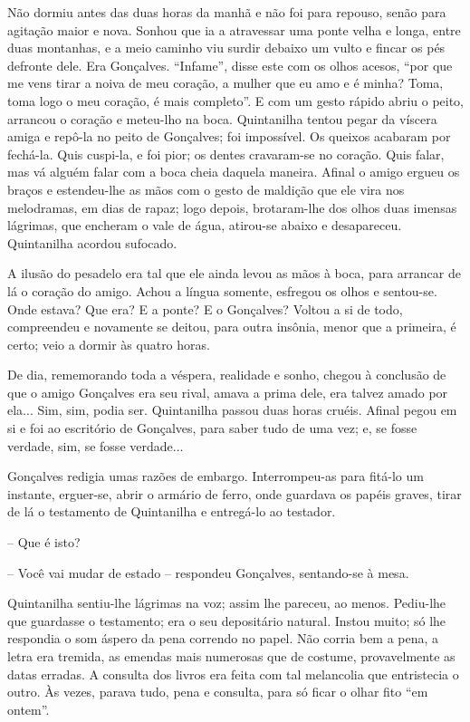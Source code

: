 Não dormiu antes das duas horas da manhã e não foi para repouso, senão
para agitação maior e nova. Sonhou que ia a atravessar uma ponte velha e
longa, entre duas montanhas, e a meio caminho viu surdir debaixo um
vulto e fincar os pés defronte dele. Era Gonçalves. ``Infame'', disse
este com os olhos acesos, ``por que me vens tirar a noiva de meu
coração, a mulher que eu amo e é minha? Toma, toma logo o meu coração, é
mais completo''. E com um gesto rápido abriu o peito, arrancou o coração
e meteu-lho na boca. Quintanilha tentou pegar da víscera amiga e repô-la
no peito de Gonçalves; foi impossível. Os queixos acabaram por fechá-la.
Quis cuspi-la, e foi pior; os dentes cravaram-se no coração. Quis falar,
mas vá alguém falar com a boca cheia daquela maneira. Afinal o amigo
ergueu os braços e estendeu-lhe as mãos com o gesto de maldição que ele
vira nos melodramas, em dias de rapaz; logo depois, brotaram-lhe dos
olhos duas imensas lágrimas, que encheram o vale de água, atirou-se
abaixo e desapareceu. Quintanilha acordou sufocado.

A ilusão do pesadelo era tal que ele ainda levou as mãos à boca, para
arrancar de lá o coração do amigo. Achou a língua somente, esfregou os
olhos e sentou-se. Onde estava? Que era? E a ponte? E o Gonçalves?
Voltou a si de todo, compreendeu e novamente se deitou, para outra
insônia, menor que a primeira, é certo; veio a dormir às quatro horas.

De dia, rememorando toda a véspera, realidade e sonho, chegou à
conclusão de que o amigo Gonçalves era seu rival, amava a prima dele,
era talvez amado por ela... Sim, sim, podia ser. Quintanilha passou duas
horas cruéis. Afinal pegou em si e foi ao escritório de Gonçalves, para
saber tudo de uma vez; e, se fosse verdade, sim, se fosse verdade...

Gonçalves redigia umas razões de embargo. Interrompeu-as para fitá-lo um
instante, erguer-se, abrir o armário de ferro, onde guardava os papéis
graves, tirar de lá o testamento de Quintanilha e entregá-lo ao
testador.

-- Que é isto?

-- Você vai mudar de estado -- respondeu Gonçalves, sentando-se à mesa.

Quintanilha sentiu-lhe lágrimas na voz; assim lhe pareceu, ao menos.
Pediu-lhe que guardasse o testamento; era o seu depositário natural.
Instou muito; só lhe respondia o som áspero da pena correndo no papel.
Não corria bem a pena, a letra era tremida, as emendas mais numerosas
que de costume, provavelmente as datas erradas. A consulta dos livros
era feita com tal melancolia que entristecia o outro. Às vezes, parava
tudo, pena e consulta, para só ficar o olhar fito ``em ontem''.

